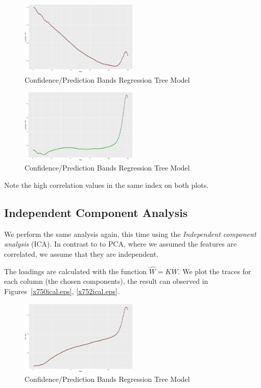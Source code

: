 \documentclass[a4paper, twocolumn]{article}
\begin{document}
        \begin{figure}[h!]
            \centering
            \caption{Confidence/Prediction Bands Regression Tree Model}
            \label{fig:x750tp}
            \includegraphics[width=0.5\textwidth]{share/A2_trace_PC1.eps}
        \end{figure}

        \begin{figure}[h!]
            \centering
            \caption{Confidence/Prediction Bands Regression Tree Model}
            \label{fig:x752tp}
            \includegraphics[width=0.5\textwidth]{share/A2_trace_PC2.eps}
        \end{figure}

        Note the high correlation values in the same index on both plots.


    \subsection*{Independent Component Analysis}

        We perform the same analysis again, this time using the \emph{Independent component analysis} (ICA). In contrast to to PCA, where we assumed the features are correlated, we assume that they are independent. 

        The loadings are calculated with the function \( \hat{W} = K \dot W \). We plot the traces for each column (the chosen components), the result can observed in Figures~\ref{x750ical.eps}, \ref{x752ical.eps}.

        \begin{figure}[h!]
            \centering
            \caption{Confidence/Prediction Bands Regression Tree Model}
            \label{fig:x750ical}
            \includegraphics[width=0.5\textwidth]{share/A2_trace_ICA1.eps}
        \end{figure}
\end{document}

